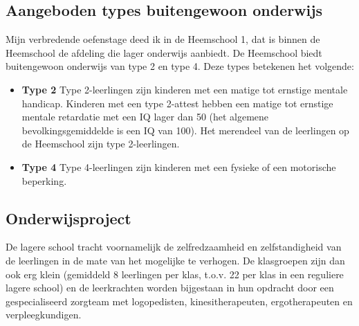 \documentclass[a4paper,11pt]{article}
\theoremstyle{definition}
\begin{document}
\subsection{Aangeboden types buitengewoon onderwijs}
\noindent Mijn verbredende oefenstage deed ik in de Heemschool 1, dat is binnen de Heemschool de afdeling
die lager onderwijs aanbiedt. De Heemschool biedt buitengewoon onderwijs van type 2 en type 4. Deze types betekenen 
het volgende:
\begin{itemize}
  \item \textbf{Type 2} Type 2-leerlingen zijn kinderen met een matige tot ernstige 
  mentale handicap. Kinderen met een type 2-attest hebben een matige tot 
  ernstige mentale retardatie met een IQ lager dan 50 (het algemene bevolkingsgemiddelde is een IQ van 
  100). Het merendeel van de leerlingen op de Heemschool zijn type 2-leerlingen.
  \item \textbf{Type 4} Type 4-leerlingen zijn kinderen met een fysieke of een motorische 
  beperking.
\end{itemize}
\subsection{Onderwijsproject}
\noindent De lagere school tracht voornamelijk de zelfredzaamheid en zelfstandigheid van 
de leerlingen in de mate van het mogelijke te verhogen. De klasgroepen zijn dan 
ook erg klein (gemiddeld 8 leerlingen per klas, t.o.v. 22 per klas in een reguliere lagere 
school) en de leerkrachten worden bijgestaan in hun opdracht door een
gespecialiseerd zorgteam met logopedisten, kinesitherapeuten, ergotherapeuten en
verpleegkundigen.\\
\end{document}
